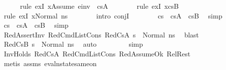 \begin{isabellebody}
\ \ \ \ \isamarkupfalse%
\ {\isacharparenleft}{\kern0pt}rule\ exI{\isacharbrackleft}{\kern0pt}\ {\isacharquery}{\kern0pt}x{\isacharequal}{\kern0pt}{\isachardoublequoteopen}Assume\ e{\isacharunderscore}{\kern0pt}inv\ {\isacharhash}{\kern0pt}\ cs{}A{\isachardoublequoteclose}{\isacharbrackright}{\kern0pt}{\isacharparenright}{\kern0pt}\isanewline
\ \ \ \ \ \ \isamarkupfalse%
\ {\isacharparenleft}{\kern0pt}rule\ exI{\isacharbrackleft}{\kern0pt}\ {\isacharquery}{\kern0pt}x{\isacharequal}{\kern0pt}cs{}B{\isacharbrackright}{\kern0pt}{\isacharparenright}{\kern0pt}\isanewline
\ \ \ \ \ \ \isamarkupfalse%
\ {\isacharparenleft}{\kern0pt}rule\ exI{\isacharbrackleft}{\kern0pt}\ {\isacharquery}{\kern0pt}x{\isacharequal}{\kern0pt}{\isachardoublequoteopen}Normal\ ns{}{\isachardoublequoteclose}{\isacharbrackright}{\kern0pt}{\isacharparenright}{\kern0pt}\isanewline
\ \ \ \ \ \ \isamarkupfalse%
\ {\isacharparenleft}{\kern0pt}intro\ conjI{\isacharparenright}{\kern0pt}\isanewline
\ \ \ \ \ \ \isamarkupfalse%
\ {\isacartoucheopen}cs{}\ {\isacharequal}{\kern0pt}\ cs{}A\ {\isacharat}{\kern0pt}\ cs{}B{\isacartoucheclose}\ \isamarkupfalse%
\ simp\isanewline
\ \ \ \ \ \ \isamarkupfalse%
\ {\isacartoucheopen}cs{}\ {\isacharequal}{\kern0pt}\ cs{}A\ {\isacharat}{\kern0pt}\ cs{}B{\isacartoucheclose}\ \isamarkupfalse%
\ simp\isanewline
\ \ \ \ \ \ \isamarkupfalse%
\ RedAssertInv\ RedCmdListCons\ RedCs{}A\ {\isacartoucheopen}s{\isacharprime}{\kern0pt}{\isacharprime}{\kern0pt}\ {\isacharequal}{\kern0pt}\ Normal\ ns{}{\isacartoucheclose}\ \isamarkupfalse%
\ blast\isanewline
\ \ \ \ \ \ \isamarkupfalse%
\ RedCs{}B\ {\isacartoucheopen}s{\isacharprime}{\kern0pt}{\isacharprime}{\kern0pt}\ {\isacharequal}{\kern0pt}\ Normal\ ns{}{\isacartoucheclose}\ \isamarkupfalse%
\ auto{\isacharbrackleft}{\kern0pt}{}{\isacharbrackright}{\kern0pt}\isanewline
\ \ \ \ \ \ \ \isamarkupfalse%
\ simp\isanewline
\ \ \ \ \ \ \isamarkupfalse%
\ InvHolds\ RedCs{}A\ RedCmdListCons\ RedAssumeOk\ RelRest\isanewline
\ \ \ \ \ \ \isamarkupfalse%
\ {\isacharparenleft}{\kern0pt}metis\ assms{\isacharparenleft}{\kern0pt}{}{\isacharparenright}{\kern0pt}\ eval{\isacharunderscore}{\kern0pt}nstate{\isacharunderscore}{\kern0pt}same{\isacharunderscore}{\kern0pt}on{\isacharparenleft}{\kern0pt}{}{\isacharparenright}{\kern0pt}{\isacharparenright}{\kern0pt}\isanewline

\end{isabellebody}

